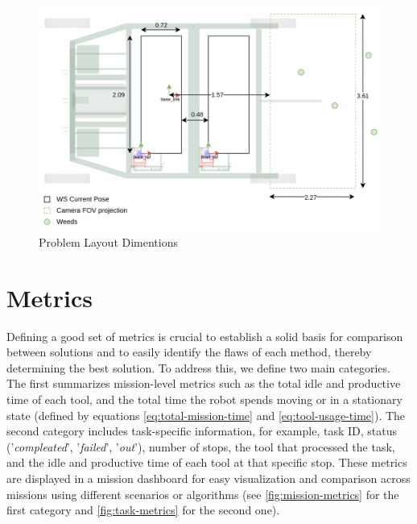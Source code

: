 \begin{figure}[bth]
    \centering
    \includegraphics[width=\linewidth]{gfx/ch03/problem_layout.png}
    \caption{Problem Layout Dimentions}
    \label{fig:problem-layout.png}
\end{figure}

\section{Metrics}
Defining a good set of metrics is crucial to establish a solid basis for comparison between solutions and to easily identify the flaws of each method, thereby determining the best solution. To address this, we define two main categories. The first summarizes mission-level metrics such as the total idle and productive time of each tool, and the total time the robot spends moving or in a stationary state (defined by equations \ref{eq:total-mission-time} and \ref{eq:tool-usage-time}). The second category includes task-specific information, for example, task ID, status ('\textit{compleated}', '\textit{failed}', '\textit{out}'), number of stops, the tool that processed the task, and the idle and productive time of each tool at that specific stop. These metrics are displayed in a mission dashboard for easy visualization and comparison across missions using different scenarios or algorithms (see \autoref{fig:mission-metrics} for the first category and \ref{fig:task-metrics} for the second one).

